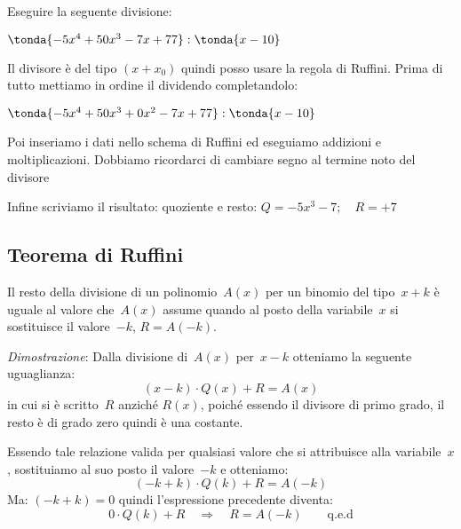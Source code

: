 %
 \begin{esempio}
Eseguire la seguente divisione:

\(\tonda{-5x^4 +50x^3 -7x +77  } : \tonda{x -10}\)

Il divisore è del tipo \((x + x_0)\) quindi posso usare la regola di Ruffini.
Prima di tutto mettiamo in ordine il dividendo completandolo:

\(\tonda{-5x^4 +50x^3 +0x^2 -7x +77  } : \tonda{x -10}\)

Poi inseriamo i dati nello schema di Ruffini ed eseguiamo addizioni e 
moltiplicazioni. Dobbiamo ricordarci di cambiare segno al termine noto del 
divisore

\begin{inaccessibleblock}
\begin{center}
% 
\ruffinie
\end{center}
\end{inaccessibleblock}

Infine scriviamo il risultato: quoziente e resto:
\(Q = -5 x^3 -7 ; \quad R = +7\)
\end{esempio}

\subsection{Teorema di Ruffini}
\label{subsec:divpol_teorema_ruffini}

\begin{teorema}
 Il resto della divisione di un polinomio~\(A(x)\) per un
binomio del tipo~\(x+k\) è uguale al valore che~\(A(x)\) assume quando
al posto della variabile~\(x\) si sostituisce il valore~\(-k\), \(R=A(-k)\).
\end{teorema}

\emph{Dimostrazione}:
Dalla divisione di~\(A(x)\) per~\(x-k\) otteniamo la seguente
uguaglianza:
\[(x-k)\cdot Q(x)+R=A(x)\]
in cui si è scritto~\(R\) anziché \(R(x)\), poiché essendo il divisore di 
primo grado, il resto è di grado zero quindi è una costante.

Essendo tale relazione valida per qualsiasi valore che si attribuisce
alla variabile~\(x\), sostituiamo al suo posto il valore~\(-k\) e otteniamo:
\[(-k+k) \cdot Q(k)+R=A(-k)\]
Ma: \((-k+k)=0\) quindi l'espressione precedente diventa:
\[0 \cdot Q(k)+R \quad \Longrightarrow \quad R=A(-k) \qquad \text{q.e.d}\]

